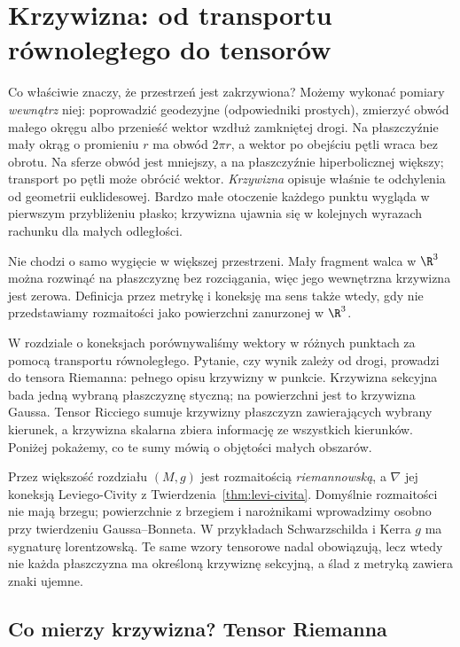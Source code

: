 \chapter{Krzywizna: od transportu równoległego do tensorów}
\label{ch:krzywizna}

Co właściwie znaczy, że przestrzeń jest zakrzywiona?
Możemy wykonać pomiary \emph{wewnątrz} niej: poprowadzić
geodezyjne (odpowiedniki prostych), zmierzyć obwód małego
okręgu albo przenieść wektor wzdłuż zamkniętej drogi.
Na płaszczyźnie mały okrąg o promieniu $r$ ma obwód
$2\pi r$, a wektor po obejściu pętli wraca bez obrotu.
Na sferze obwód jest mniejszy, a na płaszczyźnie
hiperbolicznej większy; transport po pętli może obrócić
wektor. \emph{Krzywizna} opisuje właśnie te odchylenia
od geometrii euklidesowej. Bardzo małe otoczenie
każdego punktu wygląda w pierwszym przybliżeniu
płasko; krzywizna ujawnia się w kolejnych wyrazach
rachunku dla małych odległości.

Nie chodzi o samo wygięcie w większej przestrzeni.
Mały fragment walca w $\R^3$ można rozwinąć na płaszczyznę
bez rozciągania, więc jego wewnętrzna krzywizna jest
zerowa. Definicja przez metrykę i koneksję ma sens
także wtedy, gdy nie przedstawiamy rozmaitości jako
powierzchni zanurzonej w $\R^3$.

W rozdziale o koneksjach porównywaliśmy wektory w różnych
punktach za pomocą transportu równoległego. Pytanie,
czy wynik zależy od drogi, prowadzi do tensora Riemanna:
pełnego opisu krzywizny w punkcie. Krzywizna sekcyjna
bada jedną wybraną płaszczyznę styczną; na powierzchni
jest to krzywizna Gaussa. Tensor Ricciego sumuje
krzywizny płaszczyzn zawierających wybrany kierunek,
a krzywizna skalarna zbiera informację ze wszystkich
kierunków. Poniżej pokażemy, co te sumy mówią o
objętości małych obszarów.

Przez większość rozdziału $(M,g)$ jest rozmaitością
\emph{riemannowską}, a $\nabla$ jej koneksją Leviego-Civity
z Twierdzenia~\ref{thm:levi-civita}. Domyślnie rozmaitości
nie mają brzegu; powierzchnie z brzegiem i narożnikami
wprowadzimy osobno przy twierdzeniu Gaussa--Bonneta. W przykładach
Schwarzschilda i Kerra $g$ ma sygnaturę lorentzowską.
Te same wzory tensorowe nadal obowiązują, lecz wtedy
nie każda płaszczyzna ma określoną krzywiznę sekcyjną,
a ślad z metryką zawiera znaki ujemne.

\section{Co mierzy krzywizna? Tensor Riemanna}

